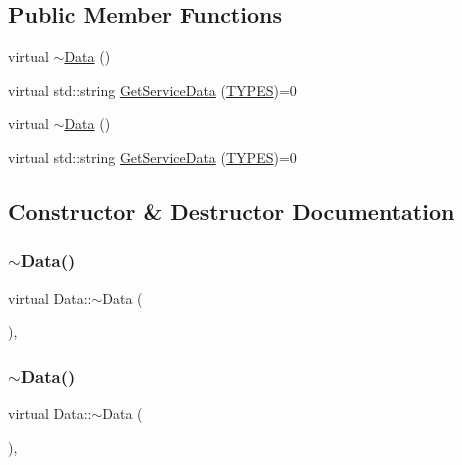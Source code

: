 \subsection*{Public Member Functions}
\begin{DoxyCompactItemize}
\item 
virtual \mbox{\hyperlink{class_data_a8c4dbe720325cd952ec9146114f22d35}{$\sim$\+Data}} ()
\item 
virtual std\+::string \mbox{\hyperlink{class_data_a0e2c25ed28d2e48b65f3c187ab0e5fa8}{Get\+Service\+Data}} (\mbox{\hyperlink{_class_adapter_2_class_adapter_2_data_8h_aacb79576e5cf053ee9c93cb9d665e32b}{T\+Y\+P\+ES}})=0
\item 
virtual \mbox{\hyperlink{class_data_a8c4dbe720325cd952ec9146114f22d35}{$\sim$\+Data}} ()
\item 
virtual std\+::string \mbox{\hyperlink{class_data_a0e2c25ed28d2e48b65f3c187ab0e5fa8}{Get\+Service\+Data}} (\mbox{\hyperlink{_class_adapter_2_class_adapter_2_data_8h_aacb79576e5cf053ee9c93cb9d665e32b}{T\+Y\+P\+ES}})=0
\end{DoxyCompactItemize}


\subsection{Constructor \& Destructor Documentation}
\mbox{\label{class_data_a8c4dbe720325cd952ec9146114f22d35}} 
\subsubsection{\texorpdfstring{$\sim$Data()}{~Data()}\hspace{0.1cm}{\footnotesize\ttfamily [1/2]}}
{\footnotesize\ttfamily virtual Data\+::$\sim$\+Data (\begin{DoxyParamCaption}{ }\end{DoxyParamCaption})\hspace{0.3cm}{\ttfamily [inline]}, {\ttfamily [virtual]}}

\mbox{\label{class_data_a8c4dbe720325cd952ec9146114f22d35}} 
\subsubsection{\texorpdfstring{$\sim$Data()}{~Data()}\hspace{0.1cm}{\footnotesize\ttfamily [2/2]}}
{\footnotesize\ttfamily virtual Data\+::$\sim$\+Data (\begin{DoxyParamCaption}{ }\end{DoxyParamCaption})\hspace{0.3cm}{\ttfamily [inline]}, {\ttfamily [virtual]}}



